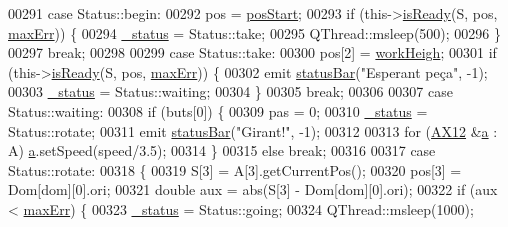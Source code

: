 \begin{DoxyCode}
00291             \textcolor{keywordflow}{case} Status::begin:
00292                 pos = \hyperlink{a00009_a67cca86496c9826987f2c543adf788be}{posStart};
00293                 \textcolor{keywordflow}{if} (this->\hyperlink{a00009_a1d96ca800864243478463b0306ed74d7}{isReady}(S, pos, \hyperlink{a00009_a3ecb7da23afe91883435f239bd08ceb3}{maxErr}))  \{
00294                     \hyperlink{a00009_a8d2299f41165bffe1656df776f7f7528}{\_status} = Status::take;
00295                     QThread::msleep(500);
00296                 \}
00297                 \textcolor{keywordflow}{break};
00298                 
00299             \textcolor{keywordflow}{case} Status::take:
00300                 pos[2] = \hyperlink{a00009_a53758fdbbee450ab4cd5a3432725f056}{workHeigh};
00301                 \textcolor{keywordflow}{if} (this->\hyperlink{a00009_a1d96ca800864243478463b0306ed74d7}{isReady}(S, pos, \hyperlink{a00009_a3ecb7da23afe91883435f239bd08ceb3}{maxErr})) \{
00302                     emit \hyperlink{a00009_a3a3adc795d88624f86e13f2525e41106}{statusBar}(\textcolor{stringliteral}{"Esperant peça"}, -1);
00303                     \hyperlink{a00009_a8d2299f41165bffe1656df776f7f7528}{\_status} = Status::waiting;
00304                 \}
00305                 \textcolor{keywordflow}{break};
00306                 
00307             \textcolor{keywordflow}{case} Status::waiting:
00308                 \textcolor{keywordflow}{if} (buts[0]) \{
00309                     pas = 0;
00310                     \hyperlink{a00009_a8d2299f41165bffe1656df776f7f7528}{\_status} = Status::rotate;
00311                     emit \hyperlink{a00009_a3a3adc795d88624f86e13f2525e41106}{statusBar}(\textcolor{stringliteral}{"Girant!"}, -1);
00312                     
00313                     \textcolor{keywordflow}{for} (\hyperlink{a00001}{AX12} &\hyperlink{a00009_a7dc3998d380d61406fe4485f9872edff}{a} : A) \hyperlink{a00009_a7dc3998d380d61406fe4485f9872edff}{a}.setSpeed(speed/3.5);
00314                 \}
00315                 \textcolor{keywordflow}{else} \textcolor{keywordflow}{break};
00316                 
00317             \textcolor{keywordflow}{case} Status::rotate:
00318             \{
00319                 S[3] = A[3].getCurrentPos();
00320                 pos[3] = Dom[dom][0].ori;
00321                 \textcolor{keywordtype}{double} aux = abs(S[3] - Dom[dom][0].ori);
00322                 \textcolor{keywordflow}{if} (aux < \hyperlink{a00009_a3ecb7da23afe91883435f239bd08ceb3}{maxErr}) \{
00323                     \hyperlink{a00009_a8d2299f41165bffe1656df776f7f7528}{\_status} = Status::going;
00324                     QThread::msleep(1000);

\end{DoxyCode}
